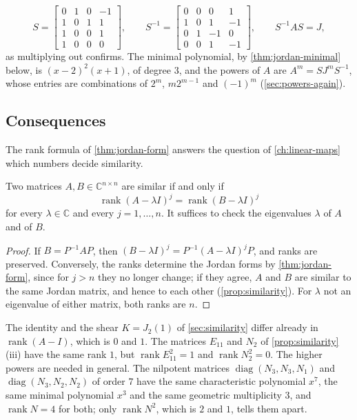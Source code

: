 \[
S=\begin{bmatrix}0&1&0&-1\\1&0&1&1\\1&0&0&1\\1&0&0&0\end{bmatrix},\qquad S^{-1}=\begin{bmatrix}0&0&0&1\\1&0&1&-1\\0&1&-1&0\\0&0&1&-1\end{bmatrix},\qquad S^{-1}AS=J ,
\]
as multiplying out confirms. The minimal polynomial, by \cref{thm:jordan-minimal} below, is $(x-2)^2(x+1)$, of degree $3$, and the powers of $A$ are $A^m=SJ^mS^{-1}$, whose entries are combinations of $2^m$, $m2^{m-1}$ and $(-1)^m$ (\cref{sec:powers-again}).

\subsection{Consequences}

The rank formula of \cref{thm:jordan-form} answers the question of \cref{ch:linear-maps} which numbers decide similarity.

\begin{corollary}
\label{cor:similarity-complete}
Two matrices $A,B\in\mathbb C^{n\times n}$ are similar if and only if
\[
\operatorname{rank}(A-\lambda I)^j=\operatorname{rank}(B-\lambda I)^j
\]
for every $\lambda\in\mathbb C$ and every $j=1,\ldots,n$. It suffices to check the eigenvalues $\lambda$ of $A$ and of $B$.
\end{corollary}

\begin{proof}
If $B=P^{-1}AP$, then $(B-\lambda I)^j=P^{-1}(A-\lambda I)^jP$, and ranks are preserved. Conversely, the ranks determine the Jordan forms by \cref{thm:jordan-form}, since for $j>n$ they no longer change; if they agree, $A$ and $B$ are similar to the same Jordan matrix, and hence to each other (\cref{prop:similarity}). For $\lambda$ not an eigenvalue of either matrix, both ranks are $n$.
\end{proof}

The identity and the shear $K=J_2(1)$ of \cref{sec:similarity} differ already in $\operatorname{rank}(A-I)$, which is $0$ and $1$. The matrices $E_{11}$ and $N_2$ of \cref{prop:similarity}\,(iii) have the same rank $1$, but $\operatorname{rank}E_{11}^2=1$ and $\operatorname{rank}N_2^2=0$. The higher powers are needed in general. The nilpotent matrices $\operatorname{diag}(N_3,N_3,N_1)$ and $\operatorname{diag}(N_3,N_2,N_2)$ of order $7$ have the same characteristic polynomial $x^7$, the same minimal polynomial $x^3$ and the same geometric multiplicity $3$, and $\operatorname{rank}N=4$ for both; only $\operatorname{rank}N^2$, which is $2$ and $1$, tells them apart.

